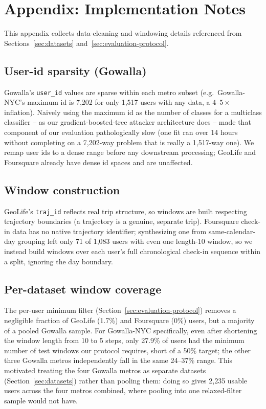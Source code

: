 \section{Appendix: Implementation Notes}
\label{sec:implementation-notes}

This appendix collects data-cleaning and windowing details referenced
from Sections~\ref{sec:datasets} and~\ref{sec:evaluation-protocol}.

\subsection{User-id sparsity (Gowalla)}
Gowalla's \texttt{user\_id} values are sparse within each metro subset
(e.g.\ Gowalla-NYC's maximum id is 7,202 for only 1,517 users with any
data, a $4$--$5\times$ inflation). Naively using the maximum id as the
number of classes for a multiclass classifier -- as our
gradient-boosted-tree attacker architecture does -- made that component
of our evaluation pathologically slow (one fit ran over 14 hours
without completing on a 7,202-way problem that is really a 1,517-way
one). We remap user ids to a dense range before any downstream
processing; GeoLife and Foursquare already have dense id spaces and are
unaffected.

\subsection{Window construction}
GeoLife's \texttt{traj\_id} reflects real trip structure, so windows are
built respecting trajectory boundaries (a trajectory is a genuine,
separate trip). Foursquare check-in data has no native trajectory
identifier; synthesizing one from same-calendar-day grouping left only
71 of 1,083 users with even one length-10 window, so we instead build
windows over each user's full chronological check-in sequence within a
split, ignoring the day boundary.

\subsection{Per-dataset window coverage}
\label{sec:coverage-rates}
The per-user minimum filter (Section~\ref{sec:evaluation-protocol})
removes a negligible fraction of GeoLife (1.7\%) and Foursquare (0\%)
users, but a majority of a pooled Gowalla sample. For Gowalla-NYC
specifically, even after shortening the window length from 10 to 5
steps, only 27.9\% of users had the minimum number of test windows our
protocol requires, short of a 50\% target; the other three Gowalla
metros independently fall in the same 24--37\% range. This motivated
treating the four Gowalla metros as separate datasets
(Section~\ref{sec:datasets}) rather than pooling them: doing so gives
2,235 usable users across the four metros combined, where pooling into
one relaxed-filter sample would not have.

